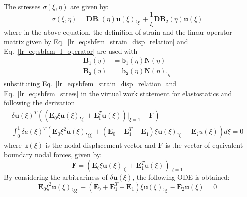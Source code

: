 The stresses $\sigma(\xi,\eta)$ are given by:
\begin{equation}
    \sigma(\xi,\eta) =  \mathbf{DB}_1(\eta) \mathbf{u}(\xi),_{\xi} +
                        \frac{1}{\xi} \mathbf{DB}_2(\eta) \mathbf{u}(\xi)
    \label{lr_eq:sbfem_stress}
\end{equation}
%
where in the above equation, the definition of strain and the linear operator matrix given by Eq.~\ref{lr_eq:sbfem_strain_disp_relation} and Eq.~\ref{lr_eq:sbfem_l_operator} are used with
\begin{equation}
    \begin{aligned}
        \mathbf{B}_1(\eta) &= \mathbf{b}_1(\eta) \mathbf{N}(\eta)    \\
        \mathbf{B}_2(\eta) &= \mathbf{b}_2(\eta) \mathbf{N}(\eta),_{\eta}
        \label{lr_eq:sbfem_captial_b}
    \end{aligned}
\end{equation}
%
substituting Eq.~\ref{lr_eq:sbfem_strain_disp_relation} and Eq.~\ref{lr_eq:sbfem_stress} in the virtual work statement for elastostatics \citep{Deeks2002} and following the derivation
\begin{equation}
    \begin{aligned}
        \delta \mathbf{u}(\xi)^{T} \left(
            (\mathbf{E}_0 \xi \mathbf{u}(\xi),_{\xi}
            + \mathbf{E}_1^T \mathbf{u}(\xi))|_{\xi=1}
            - \mathbf{F}
        \right) - \\
        \int_0^1 \delta u(\xi)^T\left(
            \mathbf{E}_0 \xi^2 \mathbf{u}(\xi),_{\xi\xi} + (\mathbf{E}_0 + \mathbf{E}_1^T - \mathbf{E}_1) \xi \mathbf{u}(\xi),_{\xi}
            - \mathbf{E}_2 u(\xi)
        \right) d\xi = 0
    \end{aligned}
    \label{lr_eq:sbfem_virtual_work}
\end{equation}
%
where $\mathbf{u}(\xi)$ is the nodal displacement vector and $\mathbf{F}$ is the vector of equivalent boundary nodal forces, given by:
\begin{equation}
    \mathbf{F} = (\mathbf{E}_0 \xi \mathbf{u}(\xi),_{\xi} + \mathbf{E}_1^T \mathbf{u}(\xi))|_{\xi=1}
    \label{lr_eq:sbfem_nodal forces}
\end{equation}
%
By considering the arbitrariness of $\delta \mathbf{u}(\xi)$, the following ODE is obtained:
\begin{equation}
    \mathbf{E}_0 \xi^2 \mathbf{u}(\xi),_{\xi\xi} + (\mathbf{E}_0 + \mathbf{E}_1^T - \mathbf{E}_1)\xi \mathbf{u}(\xi),_{\xi} - \mathbf{E}_2 \mathbf{u}(\xi) = 0
    \label{lr_eq:sbfem_ODE}
\end{equation}
